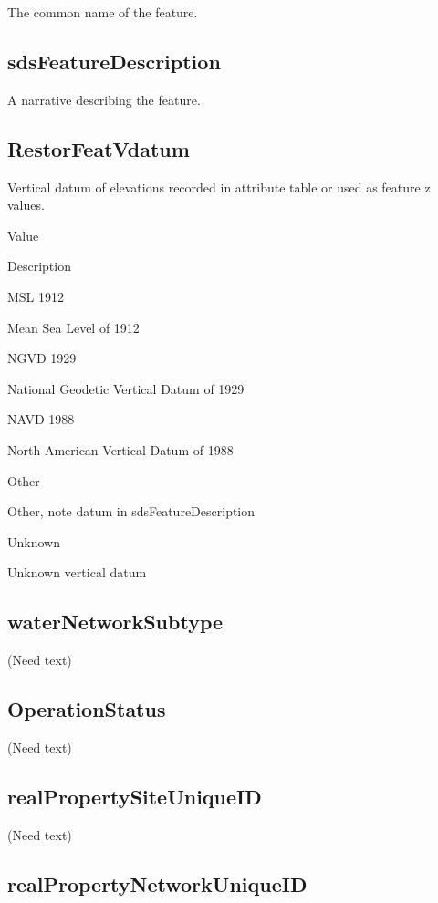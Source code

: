 \documentclass[
  letterpaper,
  DIV=11,
  numbers=noendperiod]{scrreprt}
\begin{document}
The common name of the feature.

\subsection{sdsFeatureDescription}\label{sdsfeaturedescription-25}

A narrative describing the feature.

\subsection{RestorFeatVdatum}\label{restorfeatvdatum-25}

Vertical datum of elevations recorded in attribute table or used as
feature z values.

Value

Description

MSL 1912

Mean Sea Level of 1912

NGVD 1929

National Geodetic Vertical Datum of 1929

NAVD 1988

North American Vertical Datum of 1988

Other

Other, note datum in sdsFeatureDescription

Unknown

Unknown vertical datum

\subsection{waterNetworkSubtype}\label{waternetworksubtype}

(Need text)

\subsection{OperationStatus}\label{operationstatus-3}

(Need text)

\subsection{realPropertySiteUniqueID}\label{realpropertysiteuniqueid-4}

(Need text)

\subsection{realPropertyNetworkUniqueID}\label{realpropertynetworkuniqueid-4}
\end{document}
